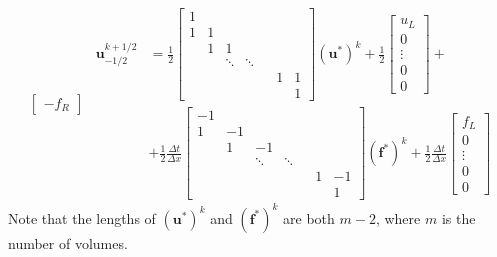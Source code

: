 \begin{subequations}
\begin{equation}
\begin{split}
\begin{bmatrix}
                -f_R
            \end{bmatrix}
        \end{split}
    \end{equation}
    \begin{equation}
        \label{eq:dirichlet_minus_flux}
        \begin{split}
            \mathbf{u}_{-1/2}^{k+1/2}&=\frac{1}{2}
            \begin{bmatrix}
                1 &   &        &        & &   &   \\
                1 & 1 &        &        & &   &   \\
                & 1 & 1      &        & &   &   \\
                &   & \ddots & \ddots & &   &   \\
                &   &        &        & & 1 & 1 \\
                &   &        &        & &   & 1
            \end{bmatrix}\left( \mathbf{u}^* \right)^k+\frac{1}{2}
            \begin{bmatrix}
                u_L    \\
                0      \\
                \vdots \\
                0      \\
                0
            \end{bmatrix}+\\
            &+\frac{1}{2}\frac{\Delta t}{\Delta x}
            \begin{bmatrix}
                -1 &    &        &        & &   &    \\
                1  & -1 &        &        & &   &    \\
                & 1  & -1     &        & &   &    \\
                &    & \ddots & \ddots & &   &    \\
                &    &        &        & & 1 & -1 \\
                &    &        &        & &   & 1
            \end{bmatrix}\left( \mathbf{f}^* \right)^k+\frac{1}{2}\frac{\Delta t}{\Delta x}
            \begin{bmatrix}
                f_L    \\
                0      \\
                \vdots \\
                0      \\
                0
            \end{bmatrix}
        \end{split}
    \end{equation}
\end{subequations}
Note that the lengths of $\left(\mathbf{u}^*\right)^k$ and $\left(\mathbf{f}^*\right)^k$ are both $m-2$, where $m$ is the number of volumes.

